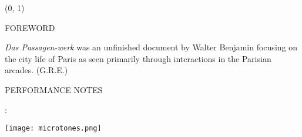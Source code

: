 \documentclass[10pt]{article}
\begin{document}
\begin{textblock}{23}(0, 1)
\begin{center}
\huge FOREWORD
\end{center}
\end{textblock}

\vspace*{0.25\baselineskip}

\begingroup
\begin{center}
\hspace{10mm} \textit{Das Passagen-werk} was an unfinished document by Walter Benjamin focusing on the city life of Paris as seen primarily through interactions in the Parisian arcades.
\rightskip\leftskip
\phantom{text} \hfill (G.R.E.)
\end{center}
\endgroup 


\begin{center}
\huge PERFORMANCE NOTES
\end{center}


\begin{center}
:
\end{center}

\begin{center}
\texttt{[image: microtones.png]}
\end{center}
\end{document}
